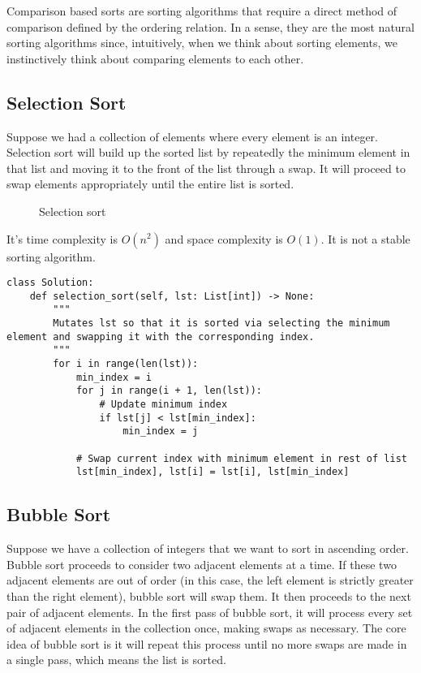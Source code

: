 Comparison based sorts are sorting algorithms that require a direct method of comparison defined by the ordering relation.
In a sense, they are the most natural sorting algorithms since, intuitively, when we think about sorting elements, we instinctively think about comparing elements to each other.

\subsection{Selection Sort}
\label{sec:selection-sort}

Suppose we had a collection of elements where every element is an integer.
Selection sort will build up the sorted list by repeatedly  the minimum element in that list and moving it to the front of the list through a swap.
It will proceed to swap elements appropriately until the entire list is sorted.

\begin{figure}[H]
  \centering
  \caption{Selection sort}
\end{figure}

It's time complexity is \(O(n^{2})\) and space complexity is \(O(1)\).
It is not a stable sorting algorithm.

\begin{lstlisting}
class Solution:
    def selection_sort(self, lst: List[int]) -> None:
        """
        Mutates lst so that it is sorted via selecting the minimum element and swapping it with the corresponding index.
        """
        for i in range(len(lst)):
            min_index = i
            for j in range(i + 1, len(lst)):
                # Update minimum index
                if lst[j] < lst[min_index]:
                    min_index = j

            # Swap current index with minimum element in rest of list
            lst[min_index], lst[i] = lst[i], lst[min_index]
\end{lstlisting}



\subsection{Bubble Sort}
\label{sec:bubble-sort}

Suppose we have a collection of integers that we want to sort in ascending order.
Bubble sort proceeds to consider two adjacent elements at a time.
If these two adjacent elements are out of order (in this case, the left element is strictly greater than the right element), bubble sort will swap them.
It then proceeds to the next pair of adjacent elements.
In the first pass of bubble sort, it will process every set of adjacent elements in the collection once, making swaps as necessary.
The core idea of bubble sort is it will repeat this process until no more swaps are made in a single pass, which means the list is sorted.



